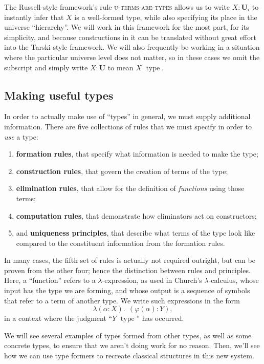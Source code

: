 \documentclass{article}
\DeclareMathOperator{\type}{~type}
\newcommand{\U}{\mathbf{U}}
\newcommand{\1}{\textbf{1}}
\newcommand{\0}{\mathbf{0}}
\newcommand{\2}{\textbf{2}}
\begin{document}
The Russell-style framework's rule \textsc{u-terms-are-types} allows us to write \( X : \U_{i} \) to instantly infer that \( X \) is a well-formed type, while also specifying its place in the universe ``hierarchy''. We will work in this framework for the most part, for its simplicity, and because constructions in it can be translated without great effort into the Tarski-style framework. We will also frequently be working in a situation where the particular universe level does not matter, so in these cases we omit the subscript and simply write \( X : \U \) to mean \( X \type \).
\subsection{Making useful types}
In order to actually make use of ``types'' in general, we must supply additional information. There are five collections of rules that we must specify in order to \emph{use} a type:
\begin{enumerate}
	\item \textbf{formation rules}, that specify what information is needed to make the type;
	\item \textbf{construction rules}, that govern the creation of terms of the type;
	\item \textbf{elimination rules}, that allow for the definition of \emph{functions} using those terms;
	\item \textbf{computation rules}, that demonstrate how eliminators act on constructors;
	\item and \textbf{uniqueness principles}, that describe what terms of the type look like compared to the constituent information from the formation rules.
\end{enumerate}
In many cases, the fifth set of rules is actually not required outright, but can be proven from the other four; hence the distinction between rules and principles. Here, a ``function'' refers to a \( \lambda \)-expression, as used in Church's \( \lambda \)-calculus, whose input has the type we are forming, and whose output is a sequence of symbols that refer to a term of another type. We write such expressions in the form
\[ \lambda(\alpha : X).~~ (\varphi(\alpha) : Y), \]
in a context where the judgment ``\( Y \type \)'' has occurred.

We will see several examples of types formed from other types, as well as some concrete types, to ensure that we aren't doing work for no reason. Then, we'll see how we can use type formers to recreate classical structures in this new system.
\end{document}
